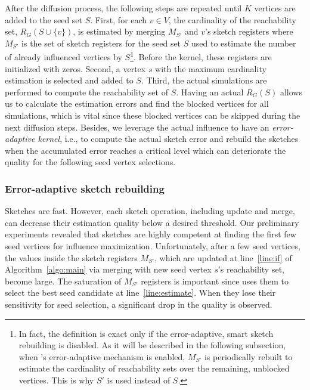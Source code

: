 \documentclass[review]{elsarticle}
\newcommand\acro{{\sc{HyperFuseR\xspace}\xspace}\xspace}
\begin{document}
After the diffusion process, the following steps are repeated until $K$ vertices are added to the seed set $S$. First, for each $v \in V$, the cardinality of the reachability set, $R_G(S \cup \{v\})$, is estimated by merging $M_{S'}$ and $v$'s sketch registers where $M_{S'}$ is the set of sketch registers for the seed set $S$ used to estimate the number of already influenced vertices by $S$\footnote{In fact, the definition is exact only if the error-adaptive, smart sketch rebuilding is disabled. As it will be described in the following subsection, when \acro's error-adaptive mechanism is enabled, $M_{S'}$ is periodically rebuilt to estimate the cardinality of reachability sets over the remaining, unblocked vertices. This is why $S'$ is used instead of $S$.}. Before the kernel, these registers are initialized with zeros. Second, a vertex $s$ with the maximum cardinality estimation is selected and added to $S$. Third, the actual simulations are performed to compute the reachability set of $S$. Having an actual $R_G(S)$ allows us to calculate the estimation errors and find the blocked vertices for all simulations, which is vital since these blocked vertices can be skipped during the next diffusion steps. Besides, we leverage the actual influence to have an {\em error-adaptive kernel}, i.e., to compute the actual sketch error and rebuild the sketches when the accumulated error reaches a critical level which can deteriorate the quality for the following seed vertex selections.

\subsubsection{Error-adaptive sketch rebuilding}

Sketches are fast. However, each sketch operation, including update and merge, can decrease their estimation quality below a desired threshold. Our preliminary experiments revealed that sketches are highly competent at finding the first few seed vertices for influence maximization. Unfortunately, after a few seed vertices, the values inside the sketch registers $M_{S'}$, which are updated at line~\ref{line:if} of Algorithm~\ref{algo:main} via merging with new seed vertex $s$'s reachability set, become large. The saturation of $M_{S'}$ registers is important since \acro uses them to select the best seed candidate at line~\ref{line:estimate}. When they lose their sensitivity for seed selection, a significant drop in the quality is observed. 
\end{document}
